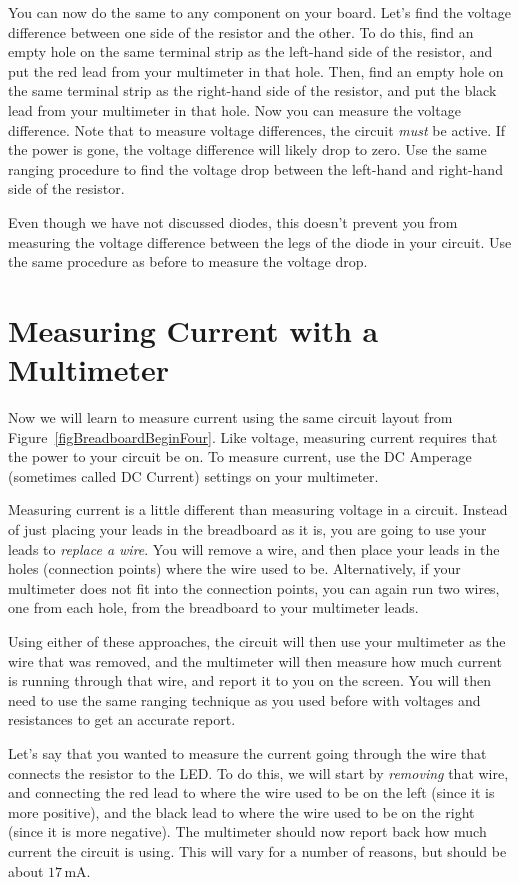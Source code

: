 You can now do the same to any component on your board.
Let's find the voltage difference between one side of the resistor and the other.
To do this, find an empty hole on the same terminal strip as the left-hand side of the resistor, and put the red lead from your multimeter in that hole.
Then, find an empty hole on the same terminal strip as the right-hand side of the resistor, and put the black lead from your multimeter in that hole.
Now you can measure the voltage difference.
Note that to measure voltage differences, the circuit \emph{must} be active.
If the power is gone, the voltage difference will likely drop to zero.
Use the same ranging procedure to find the voltage drop between the left-hand and right-hand side of the resistor.

Even though we have not discussed diodes, this doesn't prevent you from measuring the voltage difference between the legs of the diode in your circuit.
Use the same procedure as before to measure the voltage drop.

\section{Measuring Current with a Multimeter}

Now we will learn to measure current using the same circuit layout from Figure~\ref{figBreadboardBeginFour}.
Like voltage, measuring current requires that the power to your circuit be on.
To measure current, use the DC Amperage (sometimes called DC Current) settings on your multimeter.

Measuring current is a little different than measuring voltage in a circuit.
Instead of just placing your leads in the breadboard as it is, you are going to use your leads to \emph{replace a wire}.
You will remove a wire, and then place your leads in the holes (connection points) where the wire used to be.
Alternatively, if your multimeter does not fit into the connection points, you can again run two wires, one from each hole, from the breadboard to your multimeter leads.

Using either of these approaches, the circuit will then use your multimeter as the wire that was removed, and the multimeter will then measure how much current is running through that wire, and report it to you on the screen.
You will then need to use the same ranging technique as you used before with voltages and resistances to get an accurate report.

Let's say that you wanted to measure the current going through the wire that connects the resistor to the LED.
To do this, we will start by \emph{removing} that wire, and connecting the red lead to where the wire used to be on the left (since it is more positive), and the black lead to where the wire used to be on the right (since it is more negative).
The multimeter should now report back how much current the circuit is using.  
This will vary for a number of reasons, but should be about $17\,\si{\milli\ampere}$.

